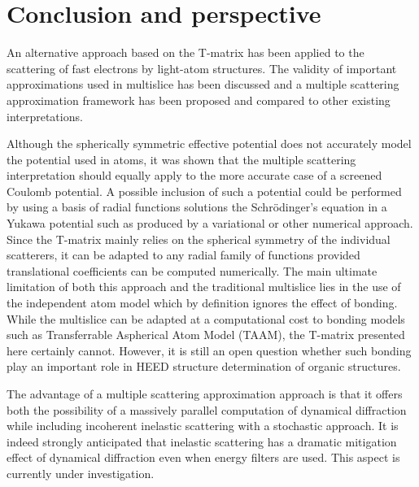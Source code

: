 \section{Conclusion and perspective}

An alternative approach based on the T-matrix has been applied to the
scattering of fast electrons by light-atom structures.
The validity of important approximations used in multislice has been
discussed and a multiple scattering approximation framework has been proposed
and compared to other existing interpretations.

Although the spherically symmetric effective potential does not accurately
model the potential used in atoms, it was shown that the multiple scattering
interpretation should equally apply to the more accurate case of a screened
Coulomb potential. A possible inclusion of such a potential could be performed
by using a basis of radial functions solutions the Schr{\"o}dinger's equation
in a Yukawa potential such as produced by a variational or other numerical approach.
Since the T-matrix mainly relies on the spherical symmetry of the individual
scatterers, it can be adapted to any radial family of functions provided translational
coefficients can be computed numerically.
The main ultimate limitation of both this approach and the traditional
multislice lies in the use of the independent atom model which by definition
ignores the effect of bonding. While the multislice can be adapted at a
computational cost to bonding models such as Transferrable Aspherical Atom
Model (TAAM), the T-matrix presented here certainly cannot.
However, it is still an open question whether such bonding play an
important role in HEED structure determination of organic structures.

The advantage of a multiple scattering approximation approach is that it offers
both the possibility of a massively parallel computation of dynamical diffraction
while including incoherent inelastic scattering with a stochastic approach.
It is indeed strongly anticipated that inelastic scattering has a dramatic
mitigation effect of dynamical diffraction even when energy filters are used.
This aspect is currently under investigation.
